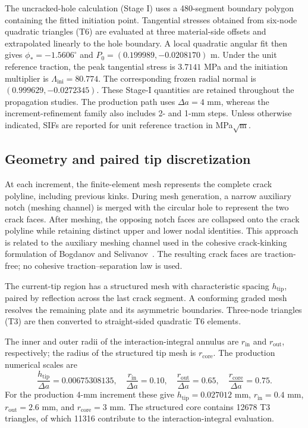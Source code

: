 \documentclass[11pt]{article}
\newcommand{\PhiStar}{-1.5606}
\newcommand{\MouthX}{0.199989}
\newcommand{\MouthY}{-0.0208170}
\newcommand{\NormalX}{0.999629}
\newcommand{\NormalY}{-0.0272345}
\newcommand{\PeakStress}{3.7141}
\newcommand{\LoadFactor}{80.774}
\begin{document}
The uncracked-hole calculation (Stage I) uses a 480-segment boundary
polygon containing the fitted initiation point. Tangential stresses
obtained from six-node quadratic triangles (T6) are evaluated at
three material-side offsets and extrapolated linearly to the hole
boundary. A local quadratic angular fit then gives
$\phi_*=\PhiStar^\circ$ and $P_0=(\MouthX,\MouthY)$ m.
Under the unit reference traction, the peak tangential stress is
$\PeakStress$ MPa and the initiation multiplier is
$\Lambda_{\mathrm{ini}}=\LoadFactor$. The corresponding frozen radial
normal is $(\NormalX,\NormalY)$. These Stage-I quantities are retained
throughout the propagation studies. The production path uses
$\Delta a=4$ mm, whereas the increment-refinement family also
includes 2- and 1-mm steps. Unless otherwise indicated, SIFs are
reported for unit reference traction in MPa$\sqrt{\mathrm m}$.

\subsection{Geometry and paired tip discretization}
At each increment, the finite-element mesh represents the complete
crack polyline, including previous kinks. During mesh generation,
a narrow auxiliary notch (meshing channel) is merged with the circular
hole to represent the two crack faces. After meshing, the opposing
notch faces are collapsed onto the crack polyline while retaining
distinct upper and lower nodal identities. This approach is related
to the auxiliary meshing channel used in the cohesive crack-kinking
formulation of Bogdanov and Selivanov~\cite{BogdanovSelivanov2026}.
The resulting crack faces are traction-free; no cohesive
traction--separation law is used.

The current-tip region has a structured mesh with characteristic
spacing $h_{\mathrm{tip}}$, paired by reflection across the last
crack segment. A conforming graded mesh resolves the remaining plate
and its asymmetric boundaries. Three-node triangles (T3) are then
converted to straight-sided quadratic T6 elements.

The inner and outer radii of the interaction-integral annulus are
$r_{\mathrm{in}}$ and $r_{\mathrm{out}}$, respectively; the radius of
the structured tip mesh is $r_{\mathrm{core}}$. The production
numerical scales are
\begin{equation}
 \frac{h_{\mathrm{tip}}}{\Delta a}=0.00675308135,\quad
 \frac{r_{\mathrm{in}}}{\Delta a}=0.10,\quad
 \frac{r_{\mathrm{out}}}{\Delta a}=0.65,\quad
 \frac{r_{\mathrm{core}}}{\Delta a}=0.75.\label{eq:meshscales}
\end{equation}
For the production 4-mm increment these give
$h_{\mathrm{tip}}=0.027012$ mm,
$r_{\mathrm{in}}=0.4$ mm, $r_{\mathrm{out}}=2.6$ mm, and
$r_{\mathrm{core}}=3$ mm. The structured core contains 12678
T3 triangles, of which 11316 contribute to the
interaction-integral evaluation.
\end{document}

